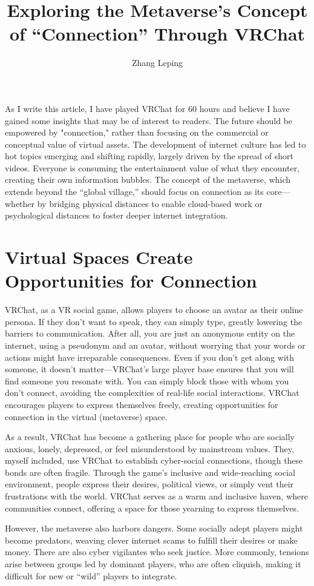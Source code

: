 \documentclass[]{article}
\title{Exploring the Metaverse’s Concept of “Connection” Through VRChat}
\author{Zhang Leping}
\date{}
\begin{document}
	\maketitle
	As I write this article, I have played VRChat for 60 hours and believe I have gained some insights that may be of interest to readers. The future should be empowered by "connection," rather than focusing on the commercial or conceptual value of virtual assets. The development of internet culture has led to hot topics emerging and shifting rapidly, largely driven by the spread of short videos. Everyone is consuming the entertainment value of what they encounter, creating their own information bubbles. The concept of the metaverse, which extends beyond the “global village,” should focus on connection as its core—whether by bridging physical distances to enable cloud-based work or psychological distances to foster deeper internet integration.
	
	\section{Virtual Spaces Create Opportunities for Connection}
	VRChat, as a VR social game, allows players to choose an avatar as their online persona. If they don't want to speak, they can simply type, greatly lowering the barriers to communication. After all, you are just an anonymous entity on the internet, using a pseudonym and an avatar, without worrying that your words or actions might have irreparable consequences. Even if you don’t get along with someone, it doesn't matter—VRChat's large player base ensures that you will find someone you resonate with. You can simply block those with whom you don't connect, avoiding the complexities of real-life social interactions. VRChat encourages players to express themselves freely, creating opportunities for connection in the virtual (metaverse) space.
	
	As a result, VRChat has become a gathering place for people who are socially anxious, lonely, depressed, or feel misunderstood by mainstream values. They, myself included, use VRChat to establish cyber-social connections, though these bonds are often fragile. Through the game's inclusive and wide-reaching social environment, people express their desires, political views, or simply vent their frustrations with the world. VRChat serves as a warm and inclusive haven, where communities connect, offering a space for those yearning to express themselves.
	
	However, the metaverse also harbors dangers. Some socially adept players might become predators, weaving clever internet scams to fulfill their desires or make money. There are also cyber vigilantes who seek justice. More commonly, tensions arise between groups led by dominant players, who are often cliquish, making it difficult for new or “wild” players to integrate.
	
\end{document}
